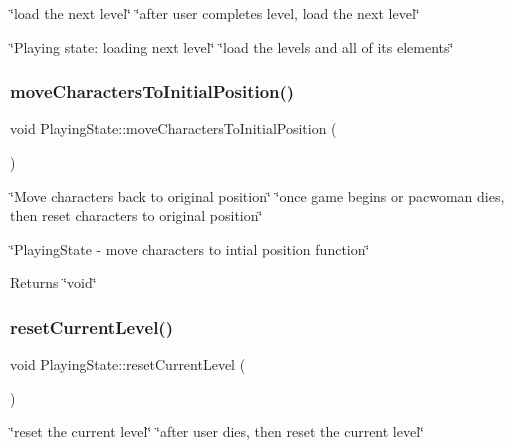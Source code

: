 \char`\"{}load the next level\char`\"{}  \char`\"{}after user completes level, load the next level\char`\"{} 

\char`\"{}\+Playing state\+: loading next level\char`\"{}  \char`\"{}load the levels and all of it\textquotesingle{}s elements\char`\"{} \mbox{\label{classPlayingState_a18d73977b811f57fd1328e76b69f39a6}} 
\subsubsection{\texorpdfstring{move\+Characters\+To\+Initial\+Position()}{moveCharactersToInitialPosition()}}
{\footnotesize\ttfamily void Playing\+State\+::move\+Characters\+To\+Initial\+Position (\begin{DoxyParamCaption}{ }\end{DoxyParamCaption})}



\char`\"{}\+Move characters back to original position\char`\"{}  \char`\"{}once game begins or pacwoman dies, then reset characters to original position\char`\"{} 

\char`\"{}\+Playing\+State -\/ move characters to intial position function\char`\"{}

\begin{DoxyReturn}{Returns}
\char`\"{}void\char`\"{} 
\end{DoxyReturn}
\mbox{\label{classPlayingState_a8b888a00a70d07082dc614b3897984a5}} 
\subsubsection{\texorpdfstring{reset\+Current\+Level()}{resetCurrentLevel()}}
{\footnotesize\ttfamily void Playing\+State\+::reset\+Current\+Level (\begin{DoxyParamCaption}{ }\end{DoxyParamCaption})}



\char`\"{}reset the current level\char`\"{}  \char`\"{}after user dies, then reset the current level\char`\"{} 


